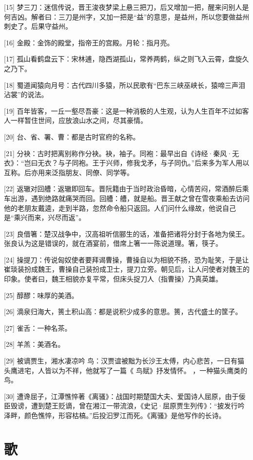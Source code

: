 \documentclass[12pt,UTF8]{ctexbook}
\begin{document}
[15] 梦三刀：迷信传说，晋王浚夜梦梁上悬三把刀，后又增加一把，醒来问别人是何吉凶。解者曰：三刀是州字，又加一把是“益”的意思，是益州，所以您要做益州刺史了。后果守益州。

[16] 金殿：金饰的殿堂，指帝王的宫殿。月轮：指月亮。

[17] 孤山看鹤盘云下：宋林逋，隐西湖孤山，常养两鹤，纵之则飞入云霄，盘旋久之乃下。

[18] 蜀道闻猿向月号：古代四川多猿，所以民歌有“巴东三峡巫峡长，猿啼三声泪沾裳”的说法。

[19] 百年皆客，一丘一壑尽吾豪：这是一种消极的人生观，认为人生百年不过如客人一样暂住世间，应放浪山水之间，尽其豪情。

[20] 台、省、署、曹：都是古时官府的名称。

[21] 分袂：古时把离别称作分袂。袂，袖子。同袍：最早出自《诗经·秦风·无衣》：“岂曰无衣？与子同袍。王于兴师，修我戈矛，与子同仇。”后来多为军人用以互称。后亦用来泛指朋友、同僚、同学等。

[22] 返辙对回艚：返辙即回车。晋阮籍由于当时政治昏暗，心情苦闷，常酒醉后乘车出游，遇到绝路就痛哭而回。回艚：艚，就是船。晋王献之曾在雪夜乘船去访问他的老朋友戴逵，走到半路，忽然命令船只返回。人们问什么缘故，他说自己是“乘兴而来，兴尽而返”。

[23] 良借箸：楚汉战争中，汉高祖听信郦生的话，准备把诸将分封于各地为侯王。张良认为这是错误的，就在酒宴前，借席上箸一一陈说道理。箸，筷子。

[24] 操提刀：传说匈奴使者要拜谒曹操，曹操自以为相貌不扬，恐为耻笑，于是让崔琰装扮成魏王，曹操自己装扮成卫士，提刀立旁。朝见后，让人问使者对魏王的印象。使者曰，魏王相貌亦复平常，但床头捉刀人（指曹操）乃真英雄。

[25] 醇醪：味厚的美酒。

[26] 滴泉归海大，篑土积山高：都是说积少成多的意思。篑，古代盛土的筐子。

[27] 雀舌：一种名茶。

[28] 羊羔：美酒名。

[29] 被谪贾生，湘水凄凉吟 鸟：汉贾谊被黜为长沙王太傅，内心悲苦，一日有猫头鹰进宅，人皆以为不祥，他就写了一篇《 鸟赋》抒发情怀。 ，一种猫头鹰类的鸟。

[30] 遭谗屈子，江潭憔悴著《离骚》：战国时期楚国大夫、爱国诗人屈原，由于佞臣毁谤，遭到楚王贬谪，曾在湘江一带流浪，《史记·屈原贾生列传》：“披发行吟泽畔，颜色憔悴，形容枯槁。”后投汩罗江而死。《离骚》是他写作的长诗。





\chapter{歌}
\end{document}
